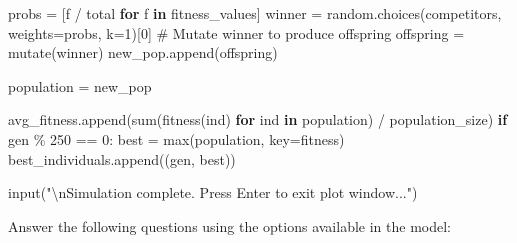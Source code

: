 \documentclass[
  letterpaper,
  DIV=11,
  numbers=noendperiod]{scrreprt}
\newenvironment{Shaded}{\begin{snugshade}}{\end{snugshade}}
\newcommand{\BuiltInTok}[1]{\textcolor[rgb]{0.00,0.23,0.31}{#1}}
\newcommand{\CharTok}[1]{\textcolor[rgb]{0.13,0.47,0.30}{#1}}
\newcommand{\CommentTok}[1]{\textcolor[rgb]{0.37,0.37,0.37}{#1}}
\newcommand{\ControlFlowTok}[1]{\textcolor[rgb]{0.00,0.23,0.31}{\textbf{#1}}}
\newcommand{\DecValTok}[1]{\textcolor[rgb]{0.68,0.00,0.00}{#1}}
\newcommand{\KeywordTok}[1]{\textcolor[rgb]{0.00,0.23,0.31}{\textbf{#1}}}
\newcommand{\NormalTok}[1]{\textcolor[rgb]{0.00,0.23,0.31}{#1}}
\newcommand{\OperatorTok}[1]{\textcolor[rgb]{0.37,0.37,0.37}{#1}}
\newcommand{\StringTok}[1]{\textcolor[rgb]{0.13,0.47,0.30}{#1}}
\theoremstyle{definition}
\theoremstyle{remark}
\begin{document}
\begin{tcolorbox}
\begin{Shaded}
\begin{Highlighting}[]
\NormalTok{        probs }\OperatorTok{=}\NormalTok{ [f }\OperatorTok{/}\NormalTok{ total }\ControlFlowTok{for}\NormalTok{ f }\KeywordTok{in}\NormalTok{ fitness\_values]}
\NormalTok{        winner }\OperatorTok{=}\NormalTok{ random.choices(competitors, weights}\OperatorTok{=}\NormalTok{probs, k}\OperatorTok{=}\DecValTok{1}\NormalTok{)[}\DecValTok{0}\NormalTok{]}
        \CommentTok{\# Mutate winner to produce offspring}
\NormalTok{        offspring }\OperatorTok{=}\NormalTok{ mutate(winner)}
\NormalTok{        new\_pop.append(offspring)}

\NormalTok{    population }\OperatorTok{=}\NormalTok{ new\_pop}

\NormalTok{    avg\_fitness.append(}\BuiltInTok{sum}\NormalTok{(fitness(ind) }\ControlFlowTok{for}\NormalTok{ ind }\KeywordTok{in}\NormalTok{ population) }\OperatorTok{/}\NormalTok{ population\_size)}
    \ControlFlowTok{if}\NormalTok{ gen }\OperatorTok{\%} \DecValTok{250} \OperatorTok{==} \DecValTok{0}\NormalTok{:}
\NormalTok{        best }\OperatorTok{=} \BuiltInTok{max}\NormalTok{(population, key}\OperatorTok{=}\NormalTok{fitness)}
\NormalTok{        best\_individuals.append((gen, best))}

\BuiltInTok{input}\NormalTok{(}\StringTok{"}\CharTok{\textbackslash{}n}\StringTok{Simulation complete. Press Enter to exit plot window..."}\NormalTok{)}
\end{Highlighting}
\end{Shaded}

\end{tcolorbox}

Answer the following questions using the options available in the model:
\end{document}
